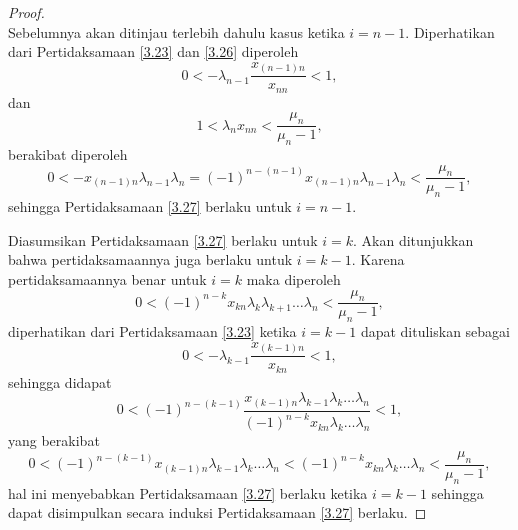 \begin{proof}
\begin{equation}
    \end{equation}
    Sebelumnya akan ditinjau terlebih dahulu kasus ketika $i=n-1$. Diperhatikan dari Pertidaksamaan \eqref{3.23} dan \eqref{3.26} diperoleh
    \begin{equation*}
        0 < -\lambda_{n-1}\frac{x_{(n-1)n}}{x_{nn}} < 1,
    \end{equation*}
    dan
    \begin{equation*}
        1 < \lambda_{n}x_{nn} <  \frac{\mu_n}{\mu_n - 1},
    \end{equation*}
    berakibat diperoleh
    \begin{equation*}
        0 < -x_{(n-1)n}\lambda_{n-1}\lambda_n = (-1)^{n-(n-1)}x_{(n-1)n}\lambda_{n-1}\lambda_n < \frac{\mu_n}{\mu_n - 1},
    \end{equation*}
    sehingga Pertidaksamaan \eqref{3.27} berlaku untuk $i=n-1$.

    Diasumsikan Pertidaksamaan \eqref{3.27} berlaku untuk $i=k$. Akan ditunjukkan bahwa pertidaksamaannya juga berlaku untuk $i=k-1$. Karena pertidaksamaannya benar untuk $i=k$ maka diperoleh
    \begin{equation*}
        0 < (-1)^{n-k}x_{kn}\lambda_k\lambda_{k+1}\dots\lambda_n < \frac{\mu_n}{\mu_n - 1},
    \end{equation*}
    diperhatikan dari Pertidaksamaan \eqref{3.23} ketika $i=k-1$ dapat dituliskan sebagai
    \begin{equation*}
        0 < - \lambda_{k-1} \frac{x_{(k-1)n}}{x_{kn}} < 1,
    \end{equation*}
    sehingga didapat
    \begin{equation*}
        0 < (-1)^{n-(k-1)} \frac{x_{(k-1)n}\lambda_{k-1}\lambda_k \dots \lambda_n }{(-1)^{n-k} x_{kn} \lambda_k \dots \lambda_n } < 1,
    \end{equation*}
    yang berakibat
    \begin{equation*}
        0 < (-1)^{n-(k-1)} x_{(k-1)n}\lambda_{k-1}\lambda_k \dots \lambda_n  < (-1)^{n-k} x_{kn} \lambda_k \dots \lambda_n  < \frac{\mu_n}{\mu_n - 1},
    \end{equation*}
    hal ini menyebabkan Pertidaksamaan \eqref{3.27} berlaku ketika $i=k-1$ sehingga dapat disimpulkan secara induksi Pertidaksamaan \eqref{3.27} berlaku.


\end{proof}
